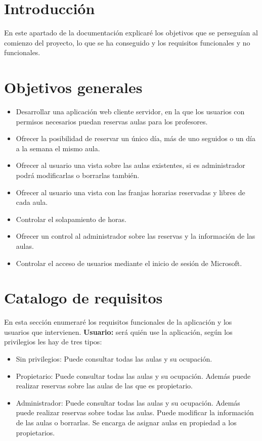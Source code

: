 
\section{Introducción}
En este apartado de la documentación explicaré  los objetivos que se perseguían al comienzo del proyecto, lo que se ha conseguido y los requisitos funcionales y no funcionales.
\section{Objetivos generales}
\begin{itemize}
	\item Desarrollar una aplicación web cliente servidor, en la que los usuarios con permisos necesarios puedan reservas aulas para los profesores.
	\item Ofrecer la posibilidad de reservar un único día, más de uno seguidos o un día a la semana el mismo aula.
	\item Ofrecer al usuario una vista sobre las aulas existentes, si es administrador podrá modificarlas o borrarlas también.
	\item Ofrecer al usuario una vista con las franjas horarias reservadas y libres de cada aula.
	\item Controlar el solapamiento de horas.
	\item Ofrecer un control al administrador sobre las reservas y la información de las aulas.
	\item Controlar el acceso de usuarios mediante el inicio de sesión de Microsoft.
\end{itemize}
\section{Catalogo de requisitos}
En esta sección enumeraré los requisitos funcionales de la aplicación y los usuarios que intervienen.\newline
\textbf{Usuario:} será quién use la aplicación, según los privilegios les hay de tres tipos:
    \begin{itemize}
        \item Sin privilegios: Puede consultar todas las aulas y su ocupación.
        \item Propietario: Puede consultar todas las aulas y su ocupación. Además puede realizar reservas sobre las aulas de las que es propietario.
        \item Administrador: Puede consultar todas las aulas y su ocupación. Además puede realizar reservas sobre todas las aulas. Puede modificar la información de las aulas o borrarlas. Se encarga de asignar aulas en propiedad a los propietarios.
    \end{itemize}
